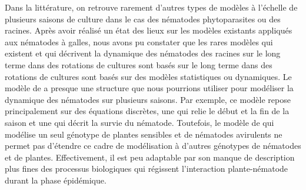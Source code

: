 	Dans la littérature, on retrouve rarement d'autres types de modèles à l’échelle  de plusieurs saisons de culture dans le cas des nématodes phytoparasites ou des racines. Après avoir réalisé un état des lieux sur les modèles existants appliqués aux nématodes à galles, nous avons pu constater que les rares  modèles  qui existent et qui décrivent la dynamique des nématodes  des racines sur le  long terme dans des rotations de cultures  sont basés sur le long terme dans des rotations de cultures sont basés sur des modèles statistiques ou dynamiques.  
Le modèle de \citet{Vandenberg2005}  a presque une structure que nous pourrions utiliser pour modéliser la dynamique des nématodes sur plusieurs saisons.  Par exemple, ce modèle repose principalement sur des équations discrètes, une qui relie le début et la fin de la saison et une qui décrit la survie du nématode.   
Toutefois, le modèle de  \citet{Vandenberg2005} qui modélise un seul génotype de plantes sensibles et de nématodes avirulents ne  permet pas d'étendre ce cadre de modélisation à d'autres génotypes de nématodes et de plantes. Effectivement, il est peu adaptable par son manque de description plus fines des processus biologiques qui régissent l’interaction plante-nématode durant la phase épidémique. 
	
